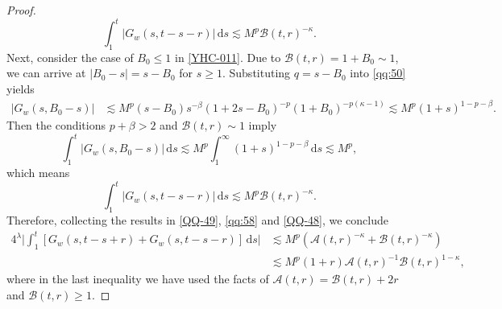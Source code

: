 \documentclass[10pt,a4paper]{amsart}
\newcommand{\Acal}{\mathcal A}
\newcommand{\Bcal}{\mathcal B}
\newcommand{\dd}{\,\mathrm{d}}
\begin{document}
\begin{proof}
\begin{equation}
\label{qq:58}
\int_1^t
|G_w(s,t-s-r)|\dd s
\lesssim
M^p\Bcal(t,r)^{-\kappa}.
\end{equation}
Next, consider the case of $B_0\leq1$ in \eqref{YHC-011}. Due to
$\Bcal(t,r)=1+B_0\sim1$,
we can arrive at $|B_0-s|=s-B_0$ for $s\geq1$. Substituting
$q=s-B_0$ into \eqref{qq:50} yields
\[
\begin{aligned}
|G_w(s,B_0-s)|
&\lesssim
M^p(s-B_0)s^{-\beta}
(1+2s-B_0)^{-p}
(1+B_0)^{-p(\kappa-1)}\lesssim
M^p(1+s)^{1-p-\beta}.
\end{aligned}
\]
Then the conditions $p+\beta>2$ and $\Bcal(t,r)\sim1$ imply
\[
\int_1^t
|G_w(s,B_0-s)|\dd s
\lesssim
M^p\int_1^\infty
(1+s)^{1-p-\beta}\dd s
\lesssim
M^p,
\]
which means
\begin{equation}\label{QQ-48}
\int_1^t
|G_w(s,t-s-r)|\dd s
\lesssim
M^p\Bcal(t,r)^{-\kappa}.
\end{equation}
Therefore, collecting the results in \eqref{QQ-49}, \eqref{qq:58} and  \eqref{QQ-48}, we conclude
\begin{equation}\label{QQ-50}
\begin{aligned}
4^\lambda \big|
\int_1^t
\left[
G_w(s,t-s+r)
+G_w(s,t-s-r)
\right]\dd s \big| 
&\lesssim
M^p
\left(
\Acal(t,r)^{-\kappa}
+\Bcal(t,r)^{-\kappa}
\right)\\
&\lesssim
M^p(1+r)
\Acal(t,r)^{-1}
\Bcal(t,r)^{1-\kappa},
\end{aligned}
\end{equation}
where in the last inequality we have used the facts of
$\Acal(t,r)=\Bcal(t,r)+2r$ and $\Bcal(t,r)\geq1$.




\end{proof}
\end{document}
